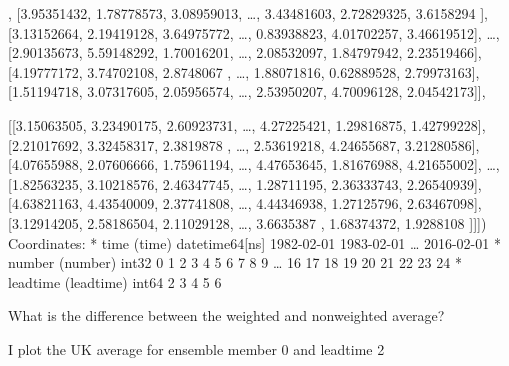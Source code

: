 \documentclass[letterpaper,10pt,english]{sphinxmanual}
\begin{document}
{\begin{sphinxVerbatim}[commandchars=\\\{\}]
       [[2.83876303, 3.61651907, 1.0950032 , {\ldots}, 1.17176117,
         2.91180608, 2.1047135 ],
        [3.95351432, 1.78778573, 3.08959013, {\ldots}, 3.43481603,
         2.72829325, 3.6158294 ],
        [3.13152664, 2.19419128, 3.64975772, {\ldots}, 0.83938823,
         4.01702257, 3.46619512],
        {\ldots},
        [2.90135673, 5.59148292, 1.70016201, {\ldots}, 2.08532097,
         1.84797942, 2.23519466],
        [4.19777172, 3.74702108, 2.8748067 , {\ldots}, 1.88071816,
         0.62889528, 2.79973163],
        [1.51194718, 3.07317605, 2.05956574, {\ldots}, 2.53950207,
         4.70096128, 2.04542173]],

       [[3.15063505, 3.23490175, 2.60923731, {\ldots}, 4.27225421,
         1.29816875, 1.42799228],
        [2.21017692, 3.32458317, 2.3819878 , {\ldots}, 2.53619218,
         4.24655687, 3.21280586],
        [4.07655988, 2.07606666, 1.75961194, {\ldots}, 4.47653645,
         1.81676988, 4.21655002],
        {\ldots},
        [1.82563235, 3.10218576, 2.46347745, {\ldots}, 1.28711195,
         2.36333743, 2.26540939],
        [4.63821163, 4.43540009, 2.37741808, {\ldots}, 4.44346938,
         1.27125796, 2.63467098],
        [3.12914205, 2.58186504, 2.11029128, {\ldots}, 3.6635387 ,
         1.68374372, 1.9288108 ]]])
Coordinates:
  * time      (time) datetime64[ns] 1982-02-01 1983-02-01 {\ldots} 2016-02-01
  * number    (number) int32 0 1 2 3 4 5 6 7 8 9 {\ldots} 16 17 18 19 20 21 22 23 24
  * leadtime  (leadtime) int64 2 3 4 5 6
\end{sphinxVerbatim}
}

What is the difference between the weighted and non\sphinxhyphen{}weighted average?

I plot the UK average for ensemble member 0 and leadtime 2

{
\begin{sphinxVerbatim}[commandchars=\\\{\}]
\llap{\color{nbsphinxin}[14]:\,\hspace{\fboxrule}\hspace{\fboxsep}}

\end{sphinxVerbatim}
}
\end{document}

